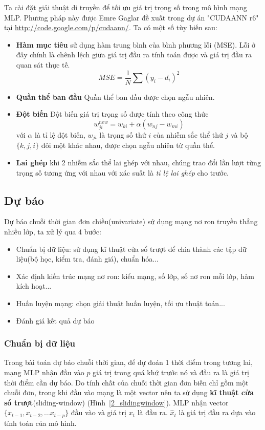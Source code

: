 Ta cài đặt giải thuật di truyền để tối ưu giá trị trọng số trong mô hình mạng MLP. Phương pháp này được Emre Gaglar đề xuất trong dự án "CUDAANN r6" tại \href{http://code.google.com/p/cudaann/}{http://code.google.com/p/cudaann/}. Ta có một số tùy biến sau:
\begin{itemize}
\item \textbf{Hàm mục tiêu} sử dụng hàm trung bình của bình phương lỗi (MSE). Lỗi ở đây chính là chênh lệch giữa giá trị đầu ra tính toán được và giá trị đầu ra quan sát thực tế.
\[
		MSE = \frac{1}{N}\sum\limits(y_i-d_i)^2	
	\]

\item \textbf{Quần thể ban đầu} Quần thể ban đầu được chọn ngẫu nhiên.
\item \textbf{Đột biến} Đột biến giá trị trọng số được tính theo công thức 
		\[
			w_{ji}^{new} = w_{ki}+ \alpha (w_{nj}-w_{mi})
		\]
		với $\alpha$ là tỉ lệ đột biến, $w_{ji}$ là trọng số thứ $i$ của nhiễm sắc thể thứ $j$ và bộ $\{k,j,i\}$ đôi một khác nhau, được chọn ngẫu nhiên từ quần thể.
\item \textbf{Lai ghép} khi 2 nhiễm sắc thể lai ghép với nhau, chúng trao đổi lần lượt từng trọng số tương ứng với nhau với xác suất là \textit{tỉ lệ lai ghép} cho trước.
\end{itemize}

\subsection{Dự báo}
Dự báo chuỗi thời gian đơn chiều(univariate) sử dụng mạng nơ ron truyền thẳng nhiều lớp, ta xử lý qua 4 bước:
\begin{itemize}
\item Chuẩn bị dữ liệu: sử dụng kĩ thuật cửa sổ trượt để chia thành các tập dữ liệu(bộ học, kiểm tra, đánh giá), chuẩn hóa...
\item Xác định kiến trúc mạng nơ ron: kiểu mạng, số lớp, số nơ ron mỗi lớp, hàm kích hoạt...
\item Huấn luyện mạng: chọn giải thuật huấn luyện, tối ưu thuật toán...
\item Đánh giá kết quả dự báo
\end{itemize}

\subsubsection{Chuẩn bị dữ liệu}
Trong bài toán dự báo chuỗi thời gian, để dự đoán 1 thời điểm trong tương lai, mạng MLP nhận đầu vào $p$ giá trị trong quá khứ trước nó và đầu ra là giá trị thời điểm cần dự báo. Do tính chất của chuỗi thời gian đơn biến chỉ gồm một chuỗi đơn, trong khi đầu vào mạng là một vector nên ta sử dụng \textbf{kĩ thuật cửa sổ trượt}(sliding-window) (Hình~\ref{2_slidingwindow}). MLP nhận vector $\{x_{t-1},x_{t-2},...x_{t-p}\}$ đầu vào và giá trị $x_t$ là đầu ra. $\hat{x}_t$ là giá trị đầu ra dựa vào tính toán của mô hình.

